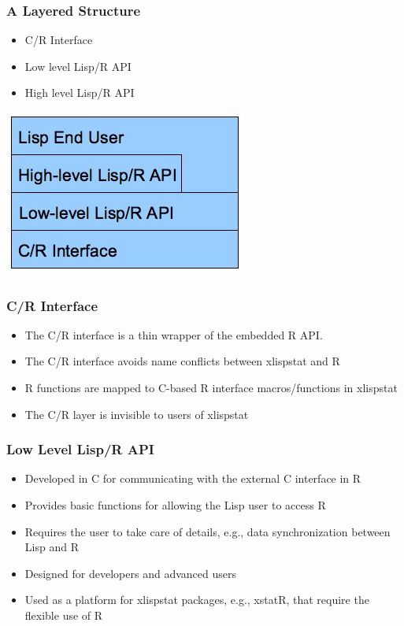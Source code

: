 \documentclass{beamer}
\begin{document}
\begin{frame}
\frametitle{A Layered Structure}
\begin{itemize}
	\item C/R Interface
	\item Low level Lisp/R API
	\item High level Lisp/R API
\end{itemize}
\includegraphics{layers.jpg}
\end{frame}

\begin{frame}
\frametitle{C/R Interface}
\begin{itemize}
	\item The C/R interface is a thin wrapper of the embedded R API.
	\item The C/R interface avoids name conflicts between xlispstat and R
	\item R functions are mapped to C-based R interface macros/functions in xlispstat
	\item The C/R layer is invisible to users of xlispstat
\end{itemize}
\end{frame}

\begin{frame}
\frametitle{Low Level Lisp/R API}
\begin{itemize}
	\item Developed in C for communicating with the external C interface in R
	\item Provides basic functions for allowing the Lisp user to access R
	\item Requires the user to take care of details, e.g., data synchronization between Lisp and R
	\item Designed for developers and advanced users
	\item Used as a platform for xlispstat packages, e.g., xstatR, that require the flexible use of R 
\end{itemize}
\end{frame}
\end{document}
